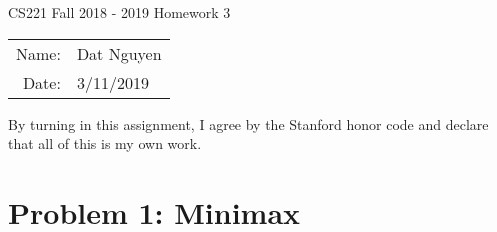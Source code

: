 \documentclass[12pt]{article}
\begin{document}
\begin{center}
{\Large CS221 Fall 2018 - 2019 Homework 3}

\begin{tabular}{rl}     
Name: & Dat Nguyen \\
Date: & 3/11/2019
\end{tabular}
\end{center}
 
 By turning in this assignment, I agree by the Stanford honor code and declare
that all of this is my own work.

\section*{Problem 1: Minimax}
\begin{enumerate}[label=(\alph*)]
    \end
\end{enumerate}
\end{document}

